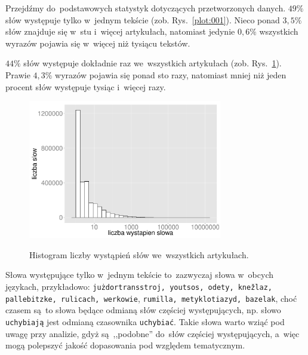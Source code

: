 \documentclass{praca1}
\begin{document}
Przejdźmy do~podstawowych statystyk dotyczących przetworzonych danych. $49\%$ słów występuje tylko w~jednym tekście (zob. Rys.~\ref{plot:001}). Nieco ponad $3{,}5\%$ słów znajduje się w~stu i~więcej artykułach, natomiast jedynie $0{,}6\%$ wszystkich wyrazów pojawia się w~więcej niż tysiącu tekstów.

$44\%$ słów występuje dokładnie raz we~wszystkich artykułach (zob. Rys.~\ref{plot:002}). Prawie $4{,}3\%$ wyrazów pojawia się ponad sto razy, natomiast mniej niż jeden procent słów występuje tysiąc i~więcej razy.


\begin{figure}[!h]
  \centering
  \includegraphics[width=240pt]{plot2.pdf}\\
  \caption{Histogram liczby wystąpień słów we~wszystkich artykułach.}\label{plot:002}
\end{figure}


Słowa występujące tylko w~jednym tekście to~zazwyczaj słowa w~obcych językach, przykładowo: \verb|jużdortransstroj, youtsos, odety, knežlaz, pallebitzke, rulicach, werkowie|, \verb|rumilla, metyklotiazyd, bazelak|,
choć czasem są~to słowa będące odmianą słów częściej występujących, np. słowo \verb|uchybiają| jest odmianą czasownika \verb|uchybiać|. Takie słowa warto wziąć pod uwagę przy analizie, gdyż są~,,podobne'' do~słów częściej występujących, a~więc mogą polepszyć jakość dopasowania pod względem tematycznym.
\end{document}
